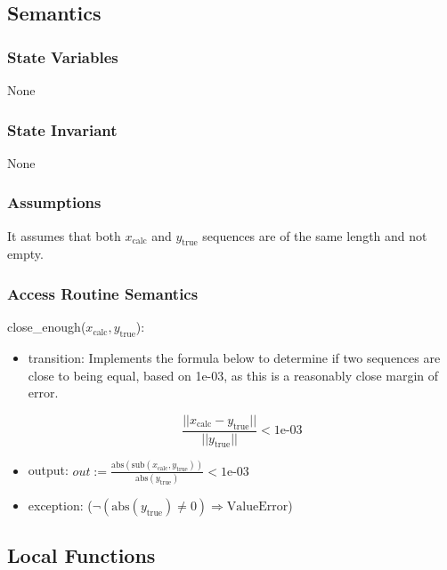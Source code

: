 \documentclass[12pt]{article}
\begin{document}
\begin{enumerate}[a)]
\subsection* {Semantics}

\subsubsection* {State Variables}

None

\subsubsection* {State Invariant}

None

\subsubsection* {Assumptions}

It assumes that both $x_\text{calc}$ and $y_\text{true}$ sequences are of the same length and 
not empty.

\subsubsection* {Access Routine Semantics}

\noindent close\_enough($x_\text{calc}, y_\text{true}$):
\begin{itemize}
\item transition: Implements the formula below to determine if two sequences are close to 
being equal, based on \text1e-03, as this is a reasonably close margin of error. 

\begin{equation}
\frac{|| x_\text{calc} - y_\text{true} ||} {||y_\text{true}||} < \text{1e-03} \label{Eq_calcError}
\end{equation} 

\item output: $out := \frac{\text{abs}(\text{sub}(x_\text{calc}, y_\text{true}))} 
{\text{abs}(y_\text{true})} < \text{1e-03}$
\item exception: ($\neg (\text{abs}(y_\text{true}) \neq 0) \Rightarrow \text{ValueError}$)
\end{itemize}

\subsection*{Local Functions}


\end{enumerate}
\end{document}
